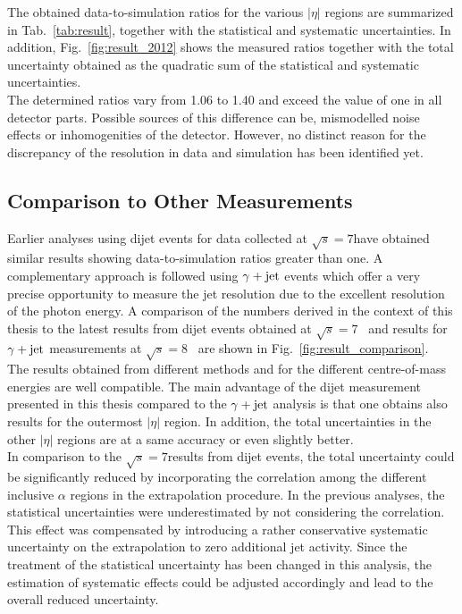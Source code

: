 The obtained data-to-simulation ratios for the various $|\eta|$ regions are summarized in Tab.~\ref{tab:result}, together with the statistical and systematic uncertainties. In addition, Fig.~\ref{fig:result_2012} shows the measured ratios together with the total uncertainty obtained as the quadratic sum of the statistical and systematic uncertainties. 
\\
The determined ratios vary from 1.06 to 1.40 and exceed the value of one in all detector parts. Possible sources of this difference can be, \eg mismodelled noise effects or inhomogenities of the detector. However, no distinct reason for the discrepancy of the resolution in data and simulation has been identified yet. 

 
\subsection{Comparison to Other Measurements}
\label{subsec:jer_results_comparison}
Earlier analyses using dijet events for data collected at $\sqrt{s}=7$\tev have obtained similar results showing data-to-simulation ratios greater than one. A complementary approach is followed using $\gamma +\rm{jet}$ events which offer a very precise opportunity to measure the jet resolution due to the excellent resolution of the photon energy. A comparison of the numbers derived in the context of this thesis to the latest results from dijet events obtained at $\sqrt{s}=7$\tev~\cite{thesis:Schroeder} and results for $\gamma +\rm{jet}$ measurements at $\sqrt{s}=8$\tev~\cite{CMS-AN-2013-179} are shown in Fig.~\ref{fig:result_comparison}.
\\
The results obtained from different methods and for the different centre-of-mass energies are well compatible. The main advantage of the dijet measurement presented in this thesis compared to the $\gamma +\rm{jet}$ analysis is that one obtains also results for the outermost $|\eta|$ region. In addition, the total uncertainties in the other $|\eta|$ regions are at a same accuracy or even slightly better. 
\\
In comparison to the $\sqrt{s}=7$\tev results from dijet events, the total uncertainty could be significantly reduced by incorporating the correlation among the different inclusive $\alpha$ regions in the extrapolation procedure. In the previous analyses, the statistical uncertainties were underestimated by not considering the correlation. This effect was compensated by introducing a rather conservative systematic uncertainty on the extrapolation to zero additional jet activity. Since the treatment of the statistical uncertainty has been changed in this analysis, the estimation of systematic effects could be adjusted accordingly and lead to the overall reduced uncertainty.
